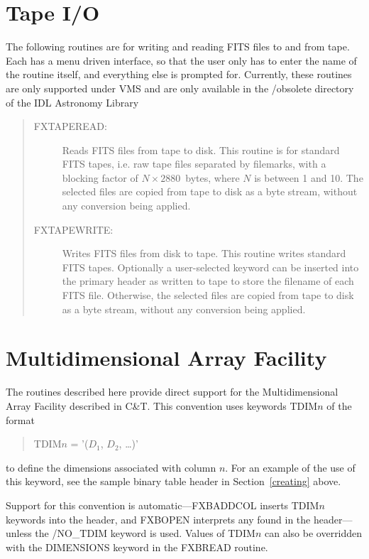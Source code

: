 \section{Tape I/O}

The following routines are for writing and reading FITS files to and from tape.
Each has a menu driven interface, so that the user only has to enter the name
of the routine itself, and everything else is prompted for.  Currently, these
routines are only supported under VMS and are only available in the /obsolete
directory of the IDL Astronomy Library
\begin{quote}
\begin{description}
\item[FXTAPEREAD:]
Reads FITS files from tape to disk.  This routine is for standard FITS tapes,
i.e. raw tape files separated by filemarks, with a blocking factor of \mbox{$N
\times 2880$}~bytes, where $N$ is between 1 and 10.  The selected files are
copied from tape to disk as a byte stream, without any conversion being
applied.
\item[FXTAPEWRITE:]
Writes FITS files from disk to tape.  This routine writes standard FITS tapes.
Optionally a user-selected keyword can be inserted into the primary header as
written to tape to store the filename of each FITS file.  Otherwise, the
selected files are copied from tape to disk as a byte stream, without any
conversion being applied.
\end{description}
\end{quote}

\section{Multidimensional Array Facility}
\label{tdim}

The routines described here provide direct support for the Multidimensional
Array Facility described in C\&T\@.  This convention uses keywords TDIM$n$ of
the format
\begin{quote}
TDIM$n$ = '($D_1$, $D_2$, \ldots)'
\end{quote}
to define the dimensions associated with column $n$.  For an example of the use
of this keyword, see the sample binary table header in Section~\ref{creating}
above.

Support for this convention is automatic---FXBADDCOL inserts TDIM$n$ keywords
into the header, and FXBOPEN interprets any found in the header---unless the
/NO\_TDIM keyword is used.  Values of TDIM$n$ can also be overridden with the
DIMENSIONS keyword in the FXBREAD routine.

